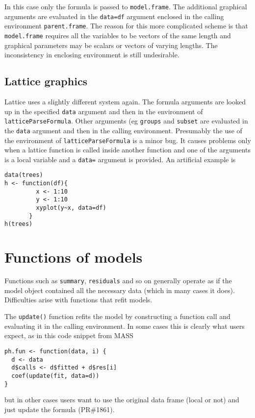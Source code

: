 \documentclass[11pt]{article}
\begin{document}
In this case only the formula is passed to \texttt{model.frame}.  The additional graphical arguments are evaluated in the  \texttt{data=df} argument enclosed in the calling environment \texttt{parent.frame}.  The reason for this more complicated scheme is that \texttt{model.frame} requires all the variables to be vectors of the same length and graphical parameters may be scalars or vectors of varying lengths. The inconsistency in enclosing environment is still undesirable.


\subsection{Lattice graphics}
Lattice uses a slightly different system again.  The formula arguments are looked up in the specified \texttt{data} argument and then in the environment of \texttt{latticeParseFormula}. Other arguments (eg \texttt{groups} and \texttt{subset} are evaluated in the \texttt{data} argument and then in the calling environment.    Presumably the use of the environment of \texttt{latticeParseFormula} is a minor bug. It causes problems only when a lattice function is called inside another function and one of the arguments is a local variable and a \texttt{data=} argument is provided.  An artificial example is
\begin{verbatim}
data(trees)
h <- function(df){
         x <- 1:10
         y <- 1:10
         xyplot(y~x, data=df)
       }
h(trees)
\end{verbatim}

\section{Functions of models}
Functions such as \texttt{summary}, \texttt{residuals} and so on
generally operate as if the model object contained all the necessary
data (which in many cases it does).  Difficulties arise with functions
that refit models.

The \texttt{update()} function refits the model by constructing a
function call and evaluating it in the calling environment.  In some cases this is clearly what users expect, as in this code snippet from MASS
\begin{verbatim}
ph.fun <- function(data, i) {
  d <- data
  d$calls <- d$fitted + d$res[i]
  coef(update(fit, data=d))
}
\end{verbatim}
but in other cases users want to use the original data frame (local or not) and just update the formula (PR\#1861).
\end{document}
